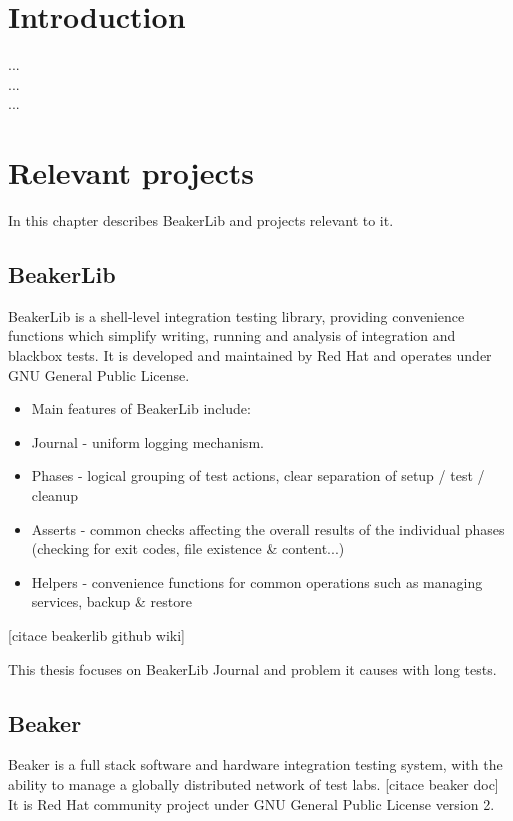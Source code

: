 
\chapter{Introduction}

...\\
...\\
...\\

\chapter{Relevant projects}

In this chapter describes BeakerLib and projects relevant to it.

\section{BeakerLib}

BeakerLib is a shell-level integration testing library, providing convenience functions which simplify writing, running and analysis of integration and blackbox tests. 
It is developed and maintained by Red Hat and operates under GNU General Public License.
\begin{itemize}
\item Main features of BeakerLib include:
\item Journal - uniform logging mechanism. 
\item Phases - logical grouping of test actions, clear separation of setup / test / cleanup
\item Asserts - common checks affecting the overall results of the individual phases (checking for exit codes, file existence \& content...)
\item Helpers - convenience functions for common operations such as managing services, backup \& restore 
\end{itemize}
[citace beakerlib github wiki]

This thesis focuses on BeakerLib Journal and problem it causes with long tests.


\section{Beaker}

Beaker is a full stack software and hardware integration testing system, with the ability to manage a globally distributed network of test labs.  [citace beaker doc] It is Red Hat community project under GNU General Public License version 2.

